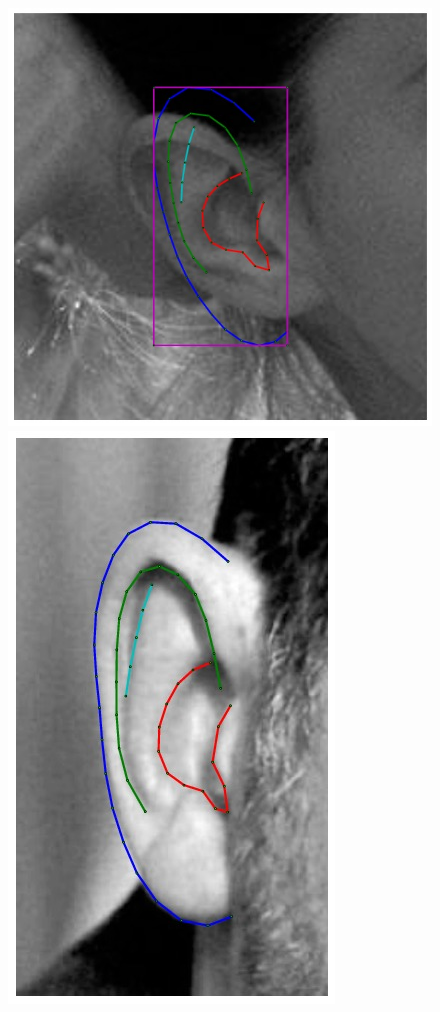 \begin{figure}
    \hfill
    \includegraphics[height=\flowh]{resources/Ear_Deformable_Model/fittings/initial_0028}
    \hfill
    \includegraphics[height=\flowh]{resources/Ear_Deformable_Model/fittings/final_0005}

\end{figure}
